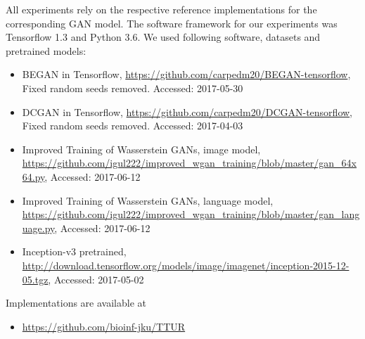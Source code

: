 \documentclass{article}
\begin{document}
All experiments rely on the respective reference implementations for
the corresponding GAN model. The software framework for our experiments was
Tensorflow 1.3 \cite{Tensorflow:16, Tensorflow:16_2} and Python 3.6.
We used following software, datasets and pretrained models:
\begin{itemize}
  \item BEGAN in Tensorflow,
  \url{https://github.com/carpedm20/BEGAN-tensorflow}, Fixed random
  seeds removed. Accessed: 2017-05-30
  \item DCGAN in Tensorflow,
  \url{https://github.com/carpedm20/DCGAN-tensorflow}, Fixed random
  seeds removed. Accessed: 2017-04-03
  \item Improved Training of Wasserstein GANs, image model,
  \url{https://github.com/igul222/improved_wgan_training/blob/master/gan_64x64.py},
  Accessed: 2017-06-12
  \item Improved Training of Wasserstein GANs, language
  model, \url{https://github.com/igul222/improved_wgan_training/blob/master/gan_language.py}, Accessed: 2017-06-12
\item Inception-v3 pretrained,
  \url{http://download.tensorflow.org/models/image/imagenet/inception-2015-12-05.tgz},
  Accessed: 2017-05-02
\end{itemize}

Implementations are available at
\begin{itemize}
  \item \url{https://github.com/bioinf-jku/TTUR}
\end{itemize}





\label{sec:references}

\listoffigures
{}
\listoftables
\end{document}
